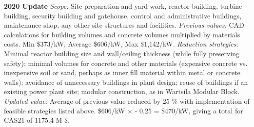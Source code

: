  \textbf{2020 Update} 
\emph{Scope: } 
Site preparation and yard work, reactor building, turbine building, security building and gatehouse, control and administrative buildings, maintenance shop, any other site structures and facilities. 
 \emph{Previous values:} CAD calculations for building volumes and concrete volumes multiplied by materials costs. 
Min \$373/kW, Average \$606/kW, Max \$1,142/kW. 
\emph{Reduction strategies: } 
Minimal reactor building size and wall/ceiling thickness (while fully preserving safety); minimal volumes for concrete and other materials (expensive concrete vs. inexpensive soil or sand, perhaps as inner fill material within metal or concrete walls); avoidance of unnecessary buildings in plant design; reuse of buildings if an existing power plant site; modular construction, as in Wartsila Modular Block. 
\emph{Updated value: } 
Average of previous value reduced by 25 \% with implementation of feasible strategies listed above. \$606/kW $\times$ - 0.25 = \$470/kW, giving a total for CAS21 of 1175.4 M \$. 

